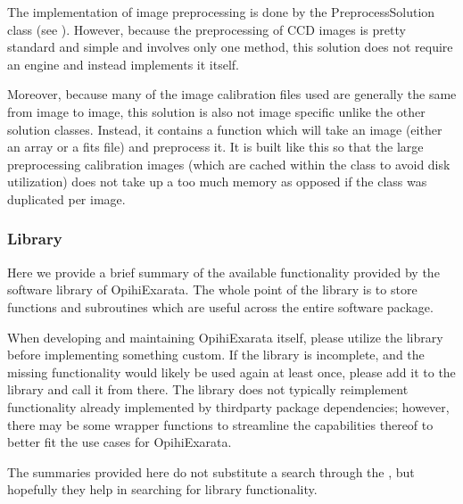 \documentclass[letterpaper,11pt,english]{sphinxmanual}
\begin{document}
\sphinxAtStartPar
The implementation of image preprocessing is done by the PreprocessSolution
class (see {\hyperref[\detokenize{code/opihiexarata.opihi.preprocess:opihiexarata.opihi.preprocess.OpihiPreprocessSolution}]{}}).
However, because the preprocessing of CCD images is pretty standard and simple
and involves only one method, this solution does not require an engine and
instead implements it itself.

\sphinxAtStartPar
Moreover, because many of the image calibration files used are generally the
same from image to image, this solution is also not image specific unlike the
other solution classes. Instead, it contains a function which will take an
image (either an array or a fits file) and pre\sphinxhyphen{}process it. It is built like
this so that the large preprocessing calibration images (which are cached
within the class to avoid disk utilization) does not take up a too much
memory as opposed if the class was duplicated per image.

\sphinxstepscope


\subsubsection{Library}
\label{\detokenize{technical/architecture/library:library}}\label{\detokenize{technical/architecture/library:technical-architecture-library}}\label{\detokenize{technical/architecture/library::doc}}
\sphinxAtStartPar
Here we provide a brief summary of the available functionality provided by the
software library of OpihiExarata. The whole point of the library is to store
functions and subroutines which are useful across the entire software
package.

\sphinxAtStartPar
When developing and maintaining OpihiExarata itself, please utilize the library
before implementing something custom. If the library is incomplete, and the
missing functionality would likely be used again at least once, please add it
to the library and call it from there. The library does not typically
reimplement functionality already implemented by third\sphinxhyphen{}party package
dependencies; however, there may be some wrapper functions to streamline
the capabilities thereof to better fit the use cases for OpihiExarata.

\sphinxAtStartPar
The summaries provided here do not substitute a search through the
{\hyperref[\detokenize{index:home-code-manual}]{}}, but hopefully they help in searching for library
functionality.
\end{document}
